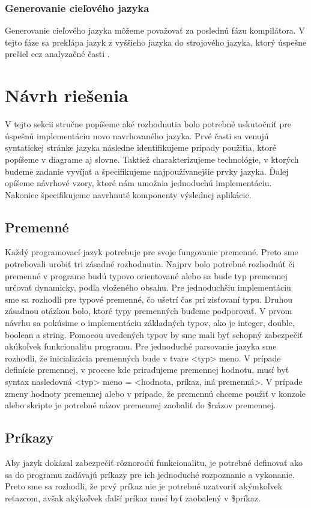 \subsubsection{Generovanie cieľového jazyka}
\indent Generovanie cieľového jazyka môžeme považovať za poslednú fázu kompilátora. V tejto fáze sa preklápa jazyk z vyššieho jazyka do strojového jazyka, ktorý úspešne prešiel cez analyzačné časti .\cite{gram}

\section{Návrh riešenia}
V tejto sekcii stručne popíšeme aké rozhodnutia bolo potrebné uskutočniť pre úspešnú implementáciu novo navrhovaného jazyka. Prvé časti sa venujú syntatickej stránke jazyka následne identifikujeme prípady použitia, ktoré popíšeme v diagrame aj slovne. Taktiež charakterizujeme technológie, v ktorých budeme zadanie vyvíjať a špecifikujeme najpoužívanejšie prvky jazyka. Ďalej opíšeme návrhové vzory, ktoré nám umožnia jednoduchú implementáciu. Nakoniec špecifikujeme navrhnuté komponenty výslednej aplikácie.
\subsection{Premenné}
\indent Každý programovací jazyk potrebuje pre svoje fungovanie premenné. Preto sme potrebovali urobiť tri zásadné rozhodnutia. 
\newline
\indent Najprv bolo potrebné rozhodnúť či premenné v programe budú typovo orientované alebo sa bude typ premennej určovať dynamicky, podľa vloženého obsahu. Pre jednoduchšiu implementáciu sme sa rozhodli pre typové premenné, čo ušetrí čas pri zisťovaní typu. 
\newline
\indent Druhou zásadnou otázkou bolo, ktoré typy premenných budeme podporovať. V prvom návrhu sa pokúsime o implementáciu základných typov, ako je integer, double, boolean a string. Pomocou uvedených typov by sme mali byť schopný zabezpečiť akúkoľvek funkcionalitu programu. 
\newline
\indent Pre jednoduché parsovanie jazyka sme rozhodli, že inicializácia premenných bude v tvare <typ> meno. V prípade definície premennej, v procese kde priraďujeme premennej hodnotu, musí byť syntax nasledovná <typ> meno = <hodnota, príkaz, iná premenná>. V prípade zmeny hodnoty premennej alebo v prípade, že premennú chceme použiť v konzole alebo skripte je potrebné názov premennej zaobaliť do \${názov premennej}.
\subsection{Príkazy}
\indent Aby jazyk dokázal zabezpečiť rôznorodú funkcionalitu, je potrebné definovať ako sa do programu zadávajú príkazy pre ich jednoduché rozpoznanie a vykonanie. Preto sme sa rozhodli, že prvý príkaz nie je potrebné uzatvoriť akýmkoľvek reťazcom, avšak akýkoľvek ďalší príkaz musí byť zaobalený v \${príkaz}.
